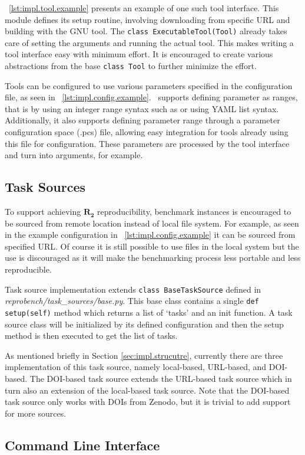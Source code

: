 \lst~\ref{lst:impl.tool.example} presents an example of one such tool interface.
This module defines its setup routine, involving downloading from specific URL and building with the GNU  tool.
The \texttt{class ExecutableTool(Tool)} already takes care of setting the arguments and running the actual tool.
This makes writing a tool interface easy with minimum effort.
It is encouraged to create various abstractions from the base \texttt{class Tool} to further minimize the effort.

Tools can be configured to use various parameters specified in the configuration file, as seen in \lst~\ref{lst:impl.config.example}.
\OurBenchmarkingTool~supports defining parameter as ranges, that is by using an integer range syntax such as  or using YAML list syntax.
Additionally, it also supports defining parameter range through a parameter configuration space (.pcs) file, allowing easy integration for tools already using this file for configuration.
These parameters are processed by the tool interface and turn into arguments, for example.


\subsection{Task Sources}

To support achieving \(\bm{R_2}\) reproducibility, benchmark instances is encouraged to be sourced from remote location instead of local file system.
For example, as seen in the example configuration in \lst~\ref{lst:impl.config.example} it can be sourced from specified URL.
Of course it is still possible to use files in the local system but the use is discouraged as it will make the benchmarking process less portable and less reproducible.

Task source implementation extends \texttt{class BaseTaskSource} defined in \emph{reprobench/task\_sources/base.py}.
This base class contains a single \texttt{def setup(self)} method which returns a list of `tasks' and an init function.
A task source class will be initialized by its defined configuration and then the setup method is then executed to get the list of tasks.

As mentioned briefly in Section \ref{sec:impl.strucutre}, currently there are three implementation of this task source, namely local-based, URL-based, and DOI-based.
The DOI-based task source extends the URL-based task source which in turn also an extension of the local-based task source.
Note that the DOI-based task source only works with DOIs from Zenodo, but it is trivial to add support for more sources.


\subsection{Command Line Interface}


